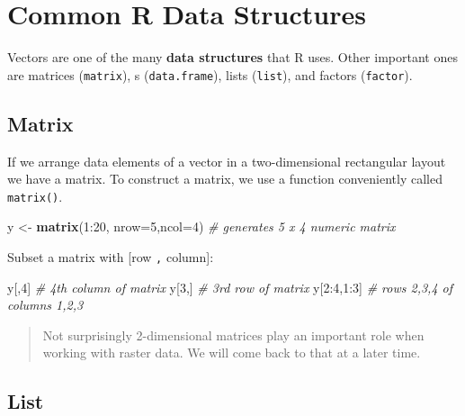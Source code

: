 \documentclass[]{book}
\newenvironment{Shaded}{\begin{snugshade}}{\end{snugshade}}
\newcommand{\KeywordTok}[1]{\textcolor[rgb]{0.13,0.29,0.53}{\textbf{{#1}}}}
\newcommand{\DataTypeTok}[1]{\textcolor[rgb]{0.13,0.29,0.53}{{#1}}}
\newcommand{\DecValTok}[1]{\textcolor[rgb]{0.00,0.00,0.81}{{#1}}}
\newcommand{\StringTok}[1]{\textcolor[rgb]{0.31,0.60,0.02}{{#1}}}
\newcommand{\CommentTok}[1]{\textcolor[rgb]{0.56,0.35,0.01}{\textit{{#1}}}}
\newcommand{\NormalTok}[1]{{#1}}
\theoremstyle{definition}
\theoremstyle{definition}
\theoremstyle{remark}
\begin{document}
\section{Common R Data Structures}\label{common-r-data-structures}

Vectors are one of the many \textbf{data structures} that R uses. Other
important ones are matrices (\texttt{matrix}), s (\texttt{data.frame}),
lists (\texttt{list}), and factors (\texttt{factor}).

\subsection{Matrix}\label{matrix}

If we arrange data elements of a vector in a two-dimensional rectangular
layout we have a matrix. To construct a matrix, we use a function
conveniently called \texttt{matrix()}.

\begin{Shaded}
\begin{Highlighting}[]
\NormalTok{y <-}\StringTok{ }\KeywordTok{matrix}\NormalTok{(}\DecValTok{1}\NormalTok{:}\DecValTok{20}\NormalTok{, }\DataTypeTok{nrow=}\DecValTok{5}\NormalTok{,}\DataTypeTok{ncol=}\DecValTok{4}\NormalTok{) }\CommentTok{# generates 5 x 4 numeric matrix}
\end{Highlighting}
\end{Shaded}

Subset a matrix with {[}row \texttt{,} column{]}:

\begin{Shaded}
\begin{Highlighting}[]
\NormalTok{y[,}\DecValTok{4}\NormalTok{]       }\CommentTok{# 4th column of matrix}
\NormalTok{y[}\DecValTok{3}\NormalTok{,]       }\CommentTok{# 3rd row of matrix}
\NormalTok{y[}\DecValTok{2}\NormalTok{:}\DecValTok{4}\NormalTok{,}\DecValTok{1}\NormalTok{:}\DecValTok{3}\NormalTok{]  }\CommentTok{# rows 2,3,4 of columns 1,2,3}
\end{Highlighting}
\end{Shaded}

\begin{quote}
Not surprisingly 2-dimensional matrices play an important role when
working with raster data. We will come back to that at a later time.
\end{quote}

\subsection{List}\label{list}
\end{document}
